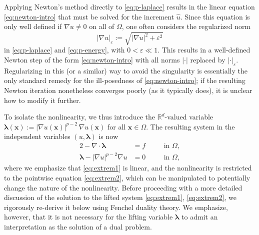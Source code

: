\documentclass[11pt,pdflatex,sn-mathphys-num]{sn-jnl}
\theoremstyle{thmstyleone}%
\theoremstyle{thmstyletwo}%
\theoremstyle{thmstylethree}%
\newcommand{\bs}[1]{\ensuremath{\boldsymbol{#1}}}
\begin{document}
Applying Newton's method directly to \eqref{eq:p-laplace} results in the linear equation \eqref{eq:newton-intro} that must be solved for the increment $\hat u$. Since this equation is only well defined if $\nabla u\not=0$ on all of $\Omega$, one often considers the regularized norm 
\begin{equation}\label{eq:eps-norm}
|\nabla u|_\varepsilon:=\sqrt{|\nabla u|^2+\varepsilon^2}
\end{equation}
in \eqref{eq:p-laplace} and \eqref{eq:p-energy}, with $0<\varepsilon\ll 1$. This results in a well-defined Newton step of the form \eqref{eq:newton-intro} with all norms $|\cdot|$ replaced by $|\cdot|_\varepsilon$. Regularizing in this (or a similar) way to avoid the singularity is essentially the only standard remedy for the ill-posedness of \eqref{eq:newton-intro}; if the resulting Newton iteration nonetheless converges poorly (as it typically does), it is unclear how to modify it further.

To isolate the nonlinearity, we thus introduce the $\mathbb R^d$-valued variable  $\bs\lambda(\bs x):= |\nabla u(\bs x)|^{p-2}\, \nabla u(\bs x) $ for all $\bs x\in\Omega$.
The resulting system in the independent variables $(u,\bs\lambda)$ is now
\begin{alignat}{2}
-\nabla\!\cdot\!\bs\lambda &= f \quad&&\text{in }\Omega,\label{eq:extrem1}\\
\bs\lambda - |\nabla u|^{p-2}\nabla u &= 0 \quad&&\text{in }\Omega,\label{eq:extrem2}
\end{alignat}
where we emphasize that \eqref{eq:extrem1} is linear, and the nonlinearity is restricted to the pointwise equation \eqref{eq:extrem2}, which can be manipulated to potentially change the nature of the nonlinearity. Before proceeding with a more detailed discussion of the solution to the lifted system \eqref{eq:extrem1}, \eqref{eq:extrem2}, we rigorously re-derive it below using Fenchel duality theory. We emphasize, however, that it is not necessary for the lifting variable $\bs\lambda$ to admit an interpretation as the solution of a dual problem.
\end{document}

